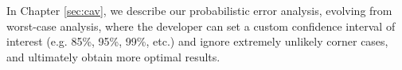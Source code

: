 %
%

%
%
%
In Chapter \ref{sec:cav}, we describe our probabilistic error analysis, evolving from worst-case analysis, where the developer can set a custom confidence interval of interest (e.g. 85\%, 95\%, 99\%, etc.) and ignore extremely unlikely corner cases, and ultimately obtain more optimal results.
%

\newpage



%
%
%

%
%
